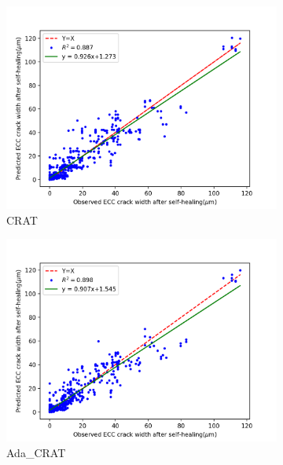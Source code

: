 \documentclass[11pt]{article}
\begin{document}
\begin{figure}[!h]
\begin{subfigure}{.35\textwidth}
			\includegraphics[width = \linewidth]{02CRAT.png}
			\caption{CRAT}
		    \end{subfigure}%
		\hspace{-1.4em}
		    \begin{subfigure}{.35\textwidth}
			\centering
			\includegraphics[width = \linewidth]{02Ada_CRAT.png}
			\caption{Ada\_CRAT}
		    \end{subfigure}%
		\hspace{-1.4em}
		    \begin{subfigure}{.35\textwidth}
			\centering

\end{subfigure}
\end{figure}
\end{document}
